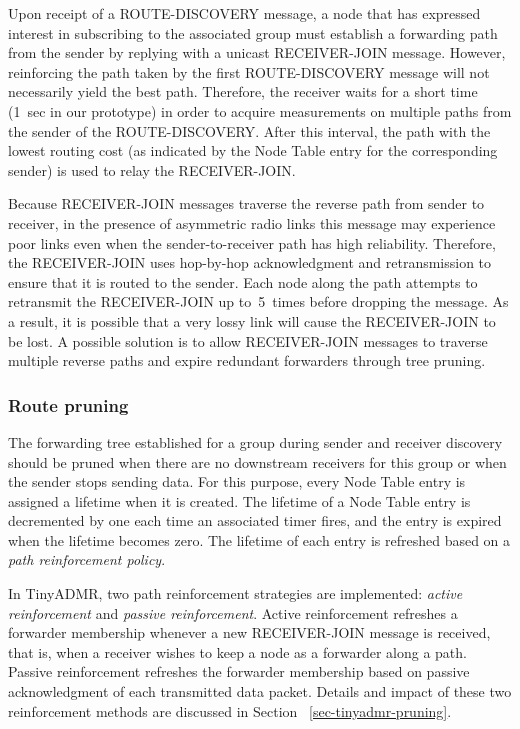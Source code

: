 Upon receipt of a ROUTE-DISCOVERY message, a node that has 
expressed interest in subscribing to the associated group 
must establish a forwarding path from the sender by 
replying with a unicast RECEIVER-JOIN message. However, reinforcing 
the path taken by the first ROUTE-DISCOVERY message 
will not necessarily yield the best path. Therefore, the receiver
waits for a short time (1~sec in our prototype) in order to acquire
measurements on multiple paths from the sender of the ROUTE-DISCOVERY.  
After this interval, the path with the lowest routing cost (as
indicated by the Node Table entry for the corresponding sender) is
used to relay the RECEIVER-JOIN.

Because RECEIVER-JOIN messages traverse the reverse path from
sender to receiver, in the presence of asymmetric radio links
this message may experience poor links even when the sender-to-receiver
path has high reliability. Therefore, the RECEIVER-JOIN uses
hop-by-hop acknowledgment and retransmission to ensure that it is
routed to the sender. Each node along the path 
attempts to retransmit the RECEIVER-JOIN up to~5~times before 
dropping the message. As a result, it is possible that a very
lossy link will cause the RECEIVER-JOIN to be lost. 
A possible solution is to allow RECEIVER-JOIN messages
to traverse multiple reverse paths and expire redundant forwarders
through tree pruning. 



\subsubsection{Route pruning}

The forwarding tree established for a group during sender and receiver
discovery should be pruned when there are no downstream receivers for
this group or when the sender stops sending data. For this purpose, every 
Node Table entry is assigned a lifetime when it is created.  The 
lifetime of a Node Table entry is decremented by one each time an 
associated timer fires, and the entry is expired when the lifetime becomes 
zero. The lifetime of each entry is refreshed based on a
{\em path reinforcement policy}. 

In TinyADMR, two path reinforcement strategies are implemented:
{\em active reinforcement} and {\em passive reinforcement}. Active
reinforcement refreshes a forwarder membership whenever a new
RECEIVER-JOIN message is received, that is, when a receiver wishes
to keep a node as a forwarder along a path. Passive reinforcement 
refreshes the forwarder membership based on passive acknowledgment of 
each transmitted data packet. 
Details and impact of these two reinforcement methods are discussed
in Section ~\ref{sec-tinyadmr-pruning}.



